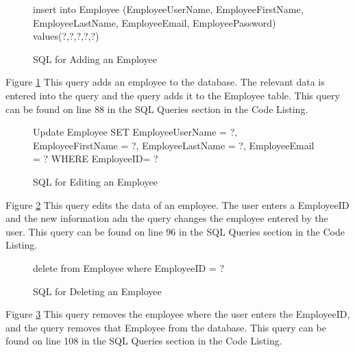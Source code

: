 \begin{figure}[H]
	 \caption{SQL for Adding an Employee} \label{fig:add-employee-sql}
\begin{sql}
insert into Employee (EmployeeUserName, EmployeeFirstName, EmployeeLastName, EmployeeEmail, EmployeePassword) values(?,?,?,?,?) 
\end{sql}
\end{figure}
Figure \ref{fig:add-employee-sql} This query adds an employee to the database. The relevant data is entered into the query and the query adds it to the Employee table. This query can be found on line 88 in the SQL Queries section in the Code Listing.

\begin{figure}[H]
	 \caption{SQL for Editing an Employee} \label{fig:edit-employee-sql}
\begin{sql}
Update Employee SET EmployeeUserName = ?,
                                     EmployeeFirstName = ?,
                                     EmployeeLastName = ?,
                                     EmployeeEmail = ?
                                     WHERE EmployeeID= ?
                                     \end{sql}
\end{figure}
Figure \ref{fig:edit-employee-sql} This query edits the data of an employee. The user enters a EmployeeID and the new information adn the query changes the employee entered by the user. This query can be found on line 96 in the SQL Queries section in the Code Listing.

\begin{figure}[H]
	 \caption{SQL for Deleting an Employee} \label{fig:delete-employee-sql}
\begin{sql}
 delete from Employee where EmployeeID = ?
  \end{sql}
\end{figure}

Figure \ref{fig:delete-employee-sql} This query removes the employee where the user enters the EmployeeID, and the query removes that Employee from the database. This query can be found on line 108 in the SQL Queries section in the Code Listing.

